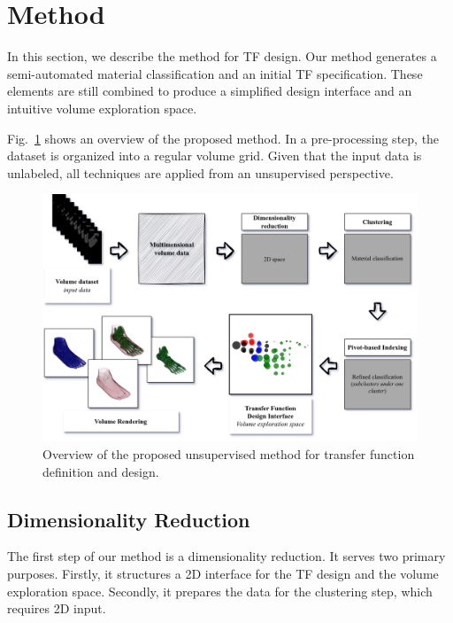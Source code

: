 \section{Method}
\label{sect:method}
In this section, we describe the method for TF design. Our method generates a semi-automated material classification and an initial TF specification. These elements are still combined to produce a simplified design interface and an intuitive volume exploration space. 

Fig.~\ref{fig:volume-exploration-pipeline} shows an overview of the proposed method. In a pre-processing step, the dataset is organized into a regular volume grid. Given that the input data is unlabeled, all techniques are applied from an unsupervised perspective. 

\begin{figure}[htb!]
    \centering
    \caption{Overview of the proposed unsupervised method for transfer function definition and design.}
    \label{fig:volume-exploration-pipeline}
    \includegraphics[width=\textwidth]{figs/method-overview.png}
\end{figure}



\subsection{Dimensionality Reduction}
\label{subsect:feature-extraction}
The first step of our method is a dimensionality reduction. It serves two primary purposes. Firstly, it structures a 2D interface for the TF design and the volume exploration space. Secondly, it prepares the data for the clustering step, which requires 2D input.

